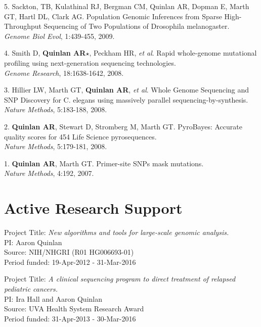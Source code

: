 \documentclass[margin,line]{cv}
\begin{document}
\begin{resume}
\begin{list}{*}{}
    \item[5.] Sackton, TB, Kulathinal RJ, Bergman CM, Quinlan AR, Dopman E, Marth GT, Hartl DL, Clark AG. 
    Population Genomic Inferences from Sparse High-Throughput Sequencing of Two Populations of Drosophila melanogaster.\\
    \textit{Genome Biol Evol}, 1:439-455, 2009.

    \item[4.] Smith D, \textbf{Quinlan AR}$\star$, Peckham HR, \textit{et al}. 
    Rapid whole-genome mutational profiling using next-generation sequencing technologies.\\
    \textit{Genome Research}, 18:1638-1642, 2008.

    \item[3.] Hillier LW, Marth GT, \textbf{Quinlan AR}, \textit{et al}. 
    Whole Genome Sequencing and SNP Discovery for C. elegans using massively parallel sequencing-by-synthesis.\\
    \textit{Nature Methods}, 5:183-188, 2008.
    
    \item[2.] \textbf{Quinlan AR}, Stewart D, Stromberg M, Marth GT. 
    PyroBayes: Accurate quality scores for 454 Life Science pyrosequences.\\
    \textit{Nature Methods}, 5:179-181, 2008.
    
    \item[1.] \textbf{Quinlan AR}, Marth GT. 
    Primer-site SNPs mask mutations.\\
    \textit{Nature Methods}, 4:192, 2007.

    \end{list}
    

    \section{\mysidestyle Active Research Support}

    Project Title: \textit{New algorithms and tools for large-scale genomic analysis.} \\
    PI: Aaron Quinlan \\
    Source: NIH/NHGRI (R01 HG006693-01) \\
    Period funded: 19-Apr-2012 - 31-Mar-2016
    
    Project Title: \textit{A clinical sequencing program to direct treatment of relapsed pediatric cancers.} \\
    PI: Ira Hall and Aaron Quinlan \\
    Source: UVA Health System Research Award  \\
    Period funded: 31-Apr-2013 - 30-Mar-2016
	    

\end{resume}
\end{document}
